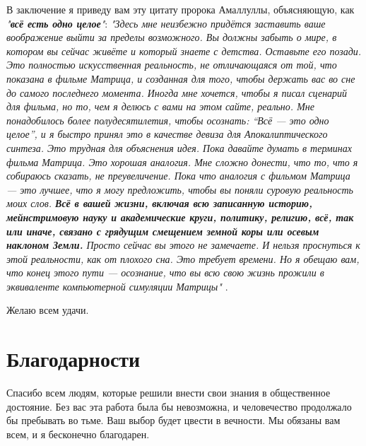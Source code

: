 \documentclass[10pt,twocolumn,letterpaper]{article}
\begin{document}
В заключение я приведу вам эту цитату пророка Амаллуллы, объясняющую, как \textit{"\textbf{всё есть одно целое}"}: \textit{"Здесь мне неизбежно придётся заставить ваше воображение выйти за пределы возможного. Вы должны забыть о мире, в котором вы сейчас живёте и который знаете с детства. Оставьте его позади. Это полностью искусственная реальность, не отличающаяся от той, что показана в фильме Матрица, и созданная для того, чтобы держать вас во сне до самого последнего момента. Иногда мне хочется, чтобы я писал сценарий для фильма, но то, чем я делюсь с вами на этом сайте, реально. Мне понадобилось более полудесятилетия, чтобы осознать: “Всё — это одно целое”, и я быстро принял это в качестве девиза для Апокалиптического синтеза. Это трудная для объяснения идея. Пока давайте думать в терминах фильма Матрица. Это хорошая аналогия. Мне сложно донести, что то, что я собираюсь сказать, не преувеличение. Пока что аналогия с фильмом Матрица — это лучшее, что я могу предложить, чтобы вы поняли суровую реальность моих слов. \textbf{Всё в вашей жизни, включая всю записанную историю, мейнстримовую науку и академические круги, политику, религию, всё, так или иначе, связано с грядущим смещением земной коры или осевым наклоном Земли.} Просто сейчас вы этого не замечаете. И нельзя проснуться к этой реальности, как от плохого сна. Это требует времени. Но я обещаю вам, что конец этого пути — осознание, что вы всю свою жизнь прожили в эквиваленте компьютерной симуляции Матрицы"} \cite{33,34}.

Желаю всем удачи.
\section{Благодарности}

Спасибо всем людям, которые решили внести свои знания в общественное достояние. Без вас эта работа была бы невозможна, и человечество продолжало бы пребывать во тьме. Ваш выбор будет цвести в вечности. Мы обязаны вам всем, и я бесконечно благодарен.

\clearpage
\twocolumn

{\small
\renewcommand{\refname}{Литература}


}
\end{document}
